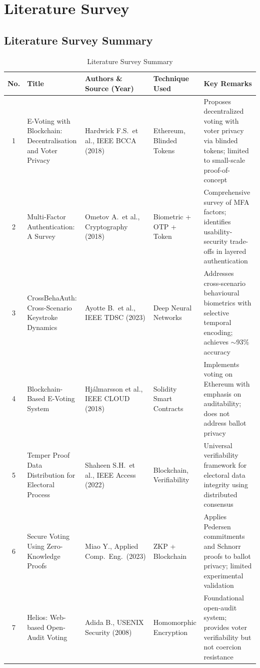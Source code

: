 \documentclass[oneside,a4paper,12pt]{book}
\begin{document}
\chapter{Literature Survey}

\section{Literature Survey Summary}

\begin{table}[htbp]
\centering
\renewcommand{\arraystretch}{1.3}
\setlength{\tabcolsep}{3pt}
\small
\begin{tabularx}{\textwidth}{|c|p{3.0cm}|p{3cm}|p{2.8cm}|X|}
\hline
\textbf{No.} & \textbf{Title} & \textbf{Authors \& Source (Year)} & \textbf{Technique Used} & \textbf{Key Remarks} \\
\hline
1 & E-Voting with Blockchain: Decentralisation and Voter Privacy & Hardwick F.S.\ et al., IEEE BCCA (2018) & Ethereum, Blinded Tokens & Proposes decentralized voting with voter privacy via blinded tokens; limited to small-scale proof-of-concept \\
\hline
2 & Multi-Factor Authentication: A Survey & Ometov A.\ et al., Cryptography (2018) & Biometric + OTP + Token & Comprehensive survey of MFA factors; identifies usability-security trade-offs in layered authentication \\
\hline
3 & CrossBehaAuth: Cross-Scenario Keystroke Dynamics & Ayotte B.\ et al., IEEE TDSC (2023) & Deep Neural Networks & Addresses cross-scenario behavioural biometrics with selective temporal encoding; achieves $\sim$93\% accuracy \\
\hline
4 & Blockchain-Based E-Voting System & Hj{\'a}lmarsson et al., IEEE CLOUD (2018) & Solidity Smart Contracts & Implements voting on Ethereum with emphasis on auditability; does not address ballot privacy \\
\hline
5 & Temper Proof Data Distribution for Electoral Process & Shaheen S.H.\ et al., IEEE Access (2022) & Blockchain, Verifiability & Universal verifiability framework for electoral data integrity using distributed consensus \\
\hline
6 & Secure Voting Using Zero-Knowledge Proofs & Miao Y., Applied Comp.\ Eng.\ (2023) & ZKP + Blockchain & Applies Pedersen commitments and Schnorr proofs to ballot privacy; limited experimental validation \\
\hline
7 & Helios: Web-based Open-Audit Voting & Adida B., USENIX Security (2008) & Homomorphic Encryption & Foundational open-audit system; provides voter verifiability but not coercion resistance \\
\hline
\end{tabularx}
\caption{Literature Survey Summary}
\label{tab:lit_survey}
\end{table}
\end{document}
